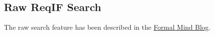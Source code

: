 
\subsection{Raw ReqIF Search}
\label{sec:raw_search}

The raw search feature has been described in the \href{http://formalmind.com/en/blog/formalmind-studio-pror-improvements-and-beta-program-about-start}{Formal Mind Blog}.

